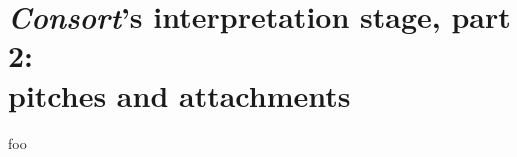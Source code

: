 \chapter[\emph{Consort}'s interpretation stage, part 2: pitches and attachments]{
    \emph{Consort}'s interpretation stage, part 2:\\ pitches and attachments}

foo